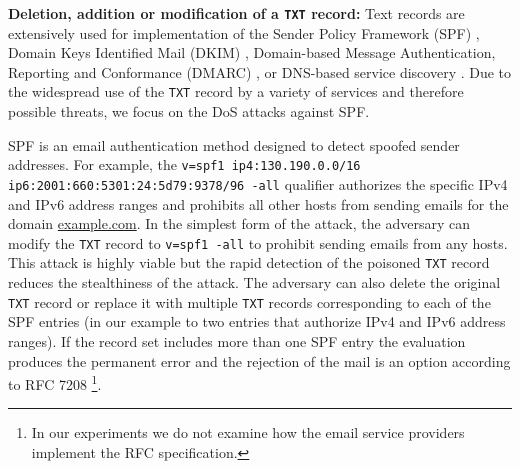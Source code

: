 \textbf{Deletion, addition or modification of a \texttt{TXT} record:} Text records are extensively used for implementation of the Sender Policy Framework (SPF) \cite{spf}, Domain Keys Identified Mail (DKIM) \cite{dkim}, Domain-based Message Authentication, Reporting and Conformance (DMARC) \cite{dmarc}, or DNS-based service discovery \cite{rfc6763}.
Due to the widespread use of the \texttt{TXT} record by a variety of services and therefore possible threats, we focus on the DoS attacks against SPF.

SPF is an email authentication method designed to detect spoofed sender addresses. %
For example, the %
\texttt{v=spf1 ip4:130.190.0.0/16} \texttt{ip6:2001:660:5301:24:5d79:9378/96 -all} qualifier %
authorizes the specific IPv4 and IPv6 address ranges 
and prohibits all other hosts from sending emails for the domain \url{example.com}.
%
In the simplest form of the attack, the adversary can modify the \texttt{TXT} record to \texttt{v=spf1 -all} to prohibit sending emails from any hosts. %
This attack is highly viable but the rapid detection of the poisoned \texttt{TXT} record reduces the stealthiness of the attack. %
The adversary can also delete the original \texttt{TXT} record or replace it with multiple \texttt{TXT} records corresponding to each of the SPF entries (in our example to two entries that authorize IPv4 and IPv6 address ranges). %
If the record set includes more than one SPF entry the evaluation produces the  permanent error and the rejection of the mail is an option according to RFC 7208 \cite{spf}\footnote{In our experiments we do not examine how the email service providers implement the RFC specification.}.
%
%
%
%
